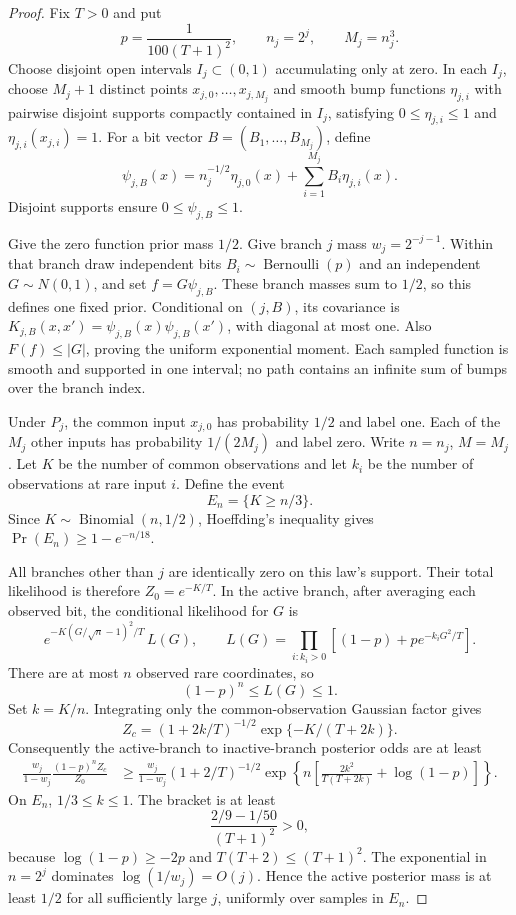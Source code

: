 \begin{proof}
Fix $T>0$ and put
\[
 p=\frac1{100(T+1)^2},\qquad n_j=2^j,\qquad M_j=n_j^3.
\]
Choose disjoint open intervals $I_j\subset(0,1)$ accumulating only at zero. In each $I_j$, choose $M_j+1$ distinct points $x_{j,0},\ldots,x_{j,M_j}$ and smooth bump functions $\eta_{j,i}$ with pairwise disjoint supports compactly contained in $I_j$, satisfying $0\le\eta_{j,i}\le1$ and $\eta_{j,i}(x_{j,i})=1$.
For a bit vector $B=(B_1,\ldots,B_{M_j})$, define
\[
 \psi_{j,B}(x)=n_j^{-1/2}\eta_{j,0}(x)
                   +\sum_{i=1}^{M_j}B_i\eta_{j,i}(x).
\]
Disjoint supports ensure $0\le\psi_{j,B}\le1$.

Give the zero function prior mass $1/2$. Give branch $j$ mass
$w_j=2^{-j-1}$. Within that branch draw independent bits
$B_i\sim\operatorname{Bernoulli}(p)$ and an independent $G\sim N(0,1)$, and set
$f=G\psi_{j,B}$. These branch masses sum to $1/2$, so this defines one fixed prior. Conditional on $(j,B)$, its covariance is
$K_{j,B}(x,x')=\psi_{j,B}(x)\psi_{j,B}(x')$, with diagonal at most one. Also $F(f)\le|G|$, proving the uniform exponential moment. Each sampled function is smooth and supported in one interval; no path contains an infinite sum of bumps over the branch index.

Under $P_j$, the common input $x_{j,0}$ has probability $1/2$ and label one. Each of the $M_j$ other inputs has probability $1/(2M_j)$ and label zero. Write $n=n_j$, $M=M_j$. Let $K$ be the number of common observations and let $k_i$ be the number of observations at rare input $i$. Define the event
\[
 E_n=\{K\ge n/3\}.
\]
Since $K\sim\operatorname{Binomial}(n,1/2)$, Hoeffding's inequality gives
$\Pr(E_n)\ge1-e^{-n/18}$.

All branches other than $j$ are identically zero on this law's support. Their total likelihood is therefore
$Z_0=e^{-K/T}$. In the active branch, after averaging each observed bit, the conditional likelihood for $G$ is
\[
 e^{-K(G/\sqrt n-1)^2/T}\,L(G),\qquad
 L(G)=\prod_{i:k_i>0}[(1-p)+p e^{-k_iG^2/T}].
\]
There are at most $n$ observed rare coordinates, so
\begin{equation}
 (1-p)^n\le L(G)\le1.
 \label{eq:gp-mixture-bit-tilt}
\end{equation}
Set $k=K/n$. Integrating only the common-observation Gaussian factor gives
\[
 Z_c=(1+2k/T)^{-1/2}\exp\{-K/(T+2k)\}.
\]
Consequently the active-branch to inactive-branch posterior odds are at least
\begin{align*}
 \frac{w_j}{1-w_j}\frac{(1-p)^n Z_c}{Z_0}
 &\ge \frac{w_j}{1-w_j}(1+2/T)^{-1/2}
       \exp\left\{n\left[
         \frac{2k^2}{T(T+2k)}+\log(1-p)\right]\right\}.
\end{align*}
On $E_n$, $1/3\le k\le1$. The bracket is at least
\[
 \frac{2/9-1/50}{(T+1)^2}>0,
\]
because $\log(1-p)\ge-2p$ and
$T(T+2)\le(T+1)^2$. The exponential in $n=2^j$ dominates
$\log(1/w_j)=O(j)$. Hence the active posterior mass is at least $1/2$ for all sufficiently large $j$, uniformly over samples in $E_n$.


\end{proof}
